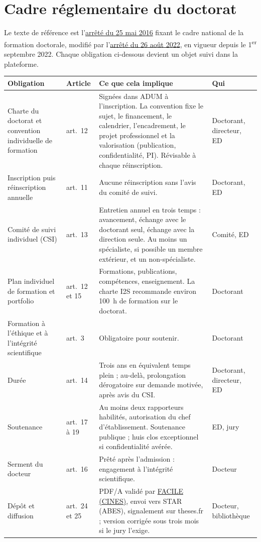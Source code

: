 \documentclass[11pt,a4paper]{article}
\begin{document}
\section{Cadre réglementaire du doctorat}

Le texte de référence est
l'\href{https://www.legifrance.gouv.fr/loda/id/JORFTEXT000032587086}{arrêté du 25 mai 2016}
fixant le cadre national de la formation doctorale, modifié par
l'\href{https://www.legifrance.gouv.fr/jorf/id/JORFTEXT000046228965}{arrêté du 26 août 2022},
en vigueur depuis le 1\textsuperscript{er} septembre 2022. Chaque obligation
ci-dessous devient un objet suivi dans la plateforme.

\begin{center}\small
\begin{tabularx}{\linewidth}{P{3.6cm} P{1.6cm} L P{2.2cm}}
\toprule
\textbf{Obligation} & \textbf{Article} & \textbf{Ce que cela implique} & \textbf{Qui}\\
\midrule
Charte du doctorat et convention individuelle de formation & art.~12 &
Signées dans ADUM à l'inscription. La convention fixe le sujet, le financement, le
calendrier, l'encadrement, le projet professionnel et la valorisation (publication,
confidentialité, PI). Révisable à chaque réinscription. & Doctorant, directeur, ED\\
Inscription puis réinscription annuelle & art.~11 &
Aucune réinscription sans l'avis du comité de suivi. & Doctorant, ED\\
Comité de suivi individuel (CSI) & art.~13 &
Entretien annuel en trois temps : avancement, échange avec le doctorant seul,
échange avec la direction seule. Au moins un spécialiste, si possible un membre
extérieur, et un non-spécialiste. & Comité, ED\\
Plan individuel de formation et portfolio & art.~12 et 15 &
Formations, publications, compétences, enseignement. La charte I2S recommande
environ 100~h de formation sur le doctorat. & Doctorant\\
Formation à l'éthique et à l'intégrité scientifique & art.~3 &
Obligatoire pour soutenir. & Doctorant\\
Durée & art.~14 &
Trois ans en équivalent temps plein ; au-delà, prolongation dérogatoire sur demande
motivée, après avis du CSI. & Doctorant, directeur, ED\\
Soutenance & art.~17 à 19 &
Au moins deux rapporteurs habilités, autorisation du chef d'établissement. Soutenance
publique ; huis clos exceptionnel si confidentialité avérée. & ED, jury\\
Serment du docteur & art.~16 &
Prêté après l'admission : engagement à l'intégrité scientifique. & Docteur\\
Dépôt et diffusion & art.~24 et 25 &
PDF/A validé par \href{https://facile.cines.fr}{FACILE (CINES)}, envoi vers STAR
(ABES), signalement sur theses.fr ; version corrigée sous trois mois si le jury
l'exige. & Docteur, bibliothèque\\
\bottomrule
\end{tabularx}
\end{center}
\end{document}
